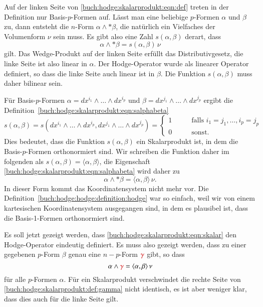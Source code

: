 Auf der linken Seite von \eqref{buch:hodge:skalarprodukt:eqn:def}
treten in der Definition nur Basis-$p$-Formen auf.
Lässt man eine beliebige $p$-Formen $\alpha$ und $\beta$ zu, dann
entsteht die $n$-Form $\alpha\wedge{\ast\beta}$, die natürlich ein
Vielfaches der Volumenform $\nu$ sein muss.
Es gibt also eine Zahl $s(\alpha,\beta)$ derart, dass
\begin{equation}
\alpha \wedge {\ast\beta} = s(\alpha,\beta)\,\nu
\label{buch:hodge:skalarprodukt:eqn:salphabeta}
\end{equation}
gilt.
Das Wedge-Produkt auf der linken Seite erfüllt das Distributivgesetz,
die linke Seite ist also linear in $\alpha$.
Der Hodge-Operator wurde als linearer Operator definiert, so dass 
die linke Seite auch linear ist in $\beta$.
Die Funktion $s(\alpha,\beta)$ muss daher bilinear sein.

Für Basis-$p$-Formen $\alpha=dx^{i_1}\wedge\dots\wedge dx^{i_p}$
und $\beta=dx^{j_1}\wedge\dots\wedge dx^{j_p}$ ergibt die
Definition~\eqref{buch:hodge:skalarprodukt:eqn:salphabeta}
\[
s(\alpha,\beta)
=
s(
dx^{i_1}\wedge\dots\wedge dx^{i_p},
dx^{j_1}\wedge\dots\wedge dx^{j_p}
)
=
\begin{cases}
1&\qquad\text{falls }i_1=j_1,\dots,i_p=j_p\\
0&\qquad\text{sonst.}
\end{cases}
\]
Dies bedeutet, dass die Funktion $s(\alpha,\beta)$ ein Skalarprodukt
ist, in dem die Basis-$p$-Formen orthonormiert sind.
Wir schreiben die Funktion daher im folgenden als
$s(\alpha,\beta)=\langle\alpha,\beta\rangle$, die Eigenschaft
\eqref{buch:hodge:skalarprodukt:eqn:salphabeta}
wird daher zu
\begin{equation}
\alpha\wedge {\ast\beta}
=
\langle\alpha,\beta\rangle\,\nu.
\label{buch:hodge:skalarprodukt:eqn:skalar}
\end{equation}
%
In dieser Form kommt das Koordinatensystem nicht mehr vor.
Die Definition~\ref{buch:hodge:hodge:definition:hodge}
war so einfach, weil wir von einem kartesischen Koordinatensystem
ausgegangen sind, in dem es plausibel ist, dass die Basis-1-Formen
orthonormiert sind.

Es soll jetzt gezeigt werden, dass
\eqref{buch:hodge:skalarprodukt:eqn:skalar}
den Hodge-Operator eindeutig definiert.
Es muss also gezeigt werden, dass zu einer gegebenen $p$-Form
$\beta$ genau eine $n-p$-Form ${\color{darkred}\gamma}$ gibt, so dass
\begin{equation}
\alpha\wedge {\color{darkred}\gamma}
=
\langle\alpha,\beta\rangle\,\nu
\label{buch:hodge:skalarprodukt:def:gamma}
\end{equation}
für alle $p$-Formen $\alpha$.
Für ein Skalarprodukt verschwindet die rechte
Seite von \eqref{buch:hodge:skalarprodukt:def:gamma}
nicht identisch, es ist aber weniger klar, dass dies auch für die
linke Seite gilt.

